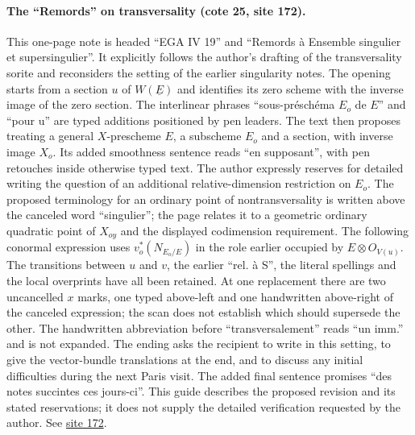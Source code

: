 \paragraph{The ``Remords'' on transversality (cote 25, site 172).}
This one-page note is headed ``EGA IV 19'' and ``Remords à Ensemble singulier et supersingulier''. It explicitly follows the author's drafting of the transversality sorite and reconsiders the setting of the earlier singularity notes. The opening starts from a section $u$ of $W(\underline E)$ and identifies its zero scheme with the inverse image of the zero section. The interlinear phrases ``sous-préschéma $E_o$ de $E$'' and ``pour u'' are typed additions positioned by pen leaders. The text then proposes treating a general $X$-prescheme $E$, a subscheme $E_o$ and a section, with inverse image $X_o$. Its added smoothness sentence reads ``en supposant'', with pen retouches inside otherwise typed text. The author expressly reserves for detailed writing the question of an additional relative-dimension restriction on $E_o$. The proposed terminology for an ordinary point of nontransversality is written above the canceled word ``singulier''; the page relates it to a geometric ordinary quadratic point of $X_{oy}$ and the displayed codimension requirement. The following conormal expression uses $v_o^*(N_{E_o/E})$ in the role earlier occupied by $E\otimes O_{V(u)}$. The transitions between $u$ and $v$, the earlier ``rel. à S'', the literal spellings and the local overprints have all been retained. At one replacement there are two uncancelled $x$ marks, one typed above-left and one handwritten above-right of the canceled expression; the scan does not establish which should supersede the other. The handwritten abbreviation before ``transversalement'' reads ``un imm.'' and is not expanded. The ending asks the recipient to write in this setting, to give the vector-bundle translations at the end, and to discuss any initial difficulties during the next Paris visit. The added final sentence promises ``des notes succintes ces jours-ci''. This guide describes the proposed revision and its stated reservations; it does not supply the detailed verification requested by the author. See \href{https://grothendieck.umontpellier.fr/web/viewer.html?file=../25.pdf#page=173}{site 172}.
